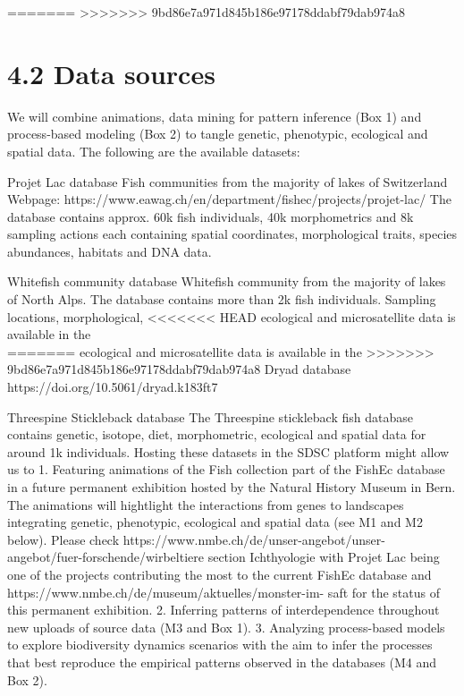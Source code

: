 \documentclass[12pt]{article}
\begin{document}
\begin{center}
=======
>>>>>>> 9bd86e7a971d845b186e97178ddabf79dab974a8
\section*{4.2 Data sources}

We will combine animations, data mining for pattern inference (Box 1) and process-based
modeling (Box 2) to tangle genetic, phenotypic, ecological and spatial data. The following
are the available datasets:

Projet Lac database
Fish communities from the majority of lakes of Switzerland
Webpage: https://www.eawag.ch/en/department/fishec/projects/projet-lac/
The database contains approx. 60k fish individuals, 40k morphometrics and 8k sampling
actions each containing spatial coordinates, morphological traits, species abundances,
habitats and DNA data.

Whitefish community database
Whitefish community from the majority of lakes of North Alps.
The database contains more than 2k fish individuals. Sampling locations, morphological,
<<<<<<< HEAD
ecological and microsatellite data is available in the\\
=======
ecological and microsatellite data is available in the
>>>>>>> 9bd86e7a971d845b186e97178ddabf79dab974a8
Dryad database https://doi.org/10.5061/dryad.k183ft7

Threespine Stickleback database
The Threespine stickleback fish database contains genetic, isotope, diet, morphometric,
ecological and spatial data for around 1k individuals.
Hosting these datasets in the SDSC platform might allow us to
1. Featuring animations of the Fish collection part of the FishEc database in a future
permanent exhibition hosted by the Natural History Museum in Bern. The animations will
hightlight the interactions from genes to landscapes integrating genetic, phenotypic,
ecological and spatial data (see M1 and M2 below). Please check
https://www.nmbe.ch/de/unser-angebot/unser-angebot/fuer-forschende/wirbeltiere
section Ichthyologie with Projet Lac being one of the projects contributing the most to
the current FishEc database and https://www.nmbe.ch/de/museum/aktuelles/monster-im-
saft for the status of this permanent exhibition.
2. Inferring patterns of interdependence throughout new uploads of source data (M3 and
Box 1).
3. Analyzing process-based models to explore biodiversity dynamics scenarios with the
aim to infer the processes that best reproduce the empirical patterns observed in the
databases (M4 and Box 2).


\end{center}
\end{document}
